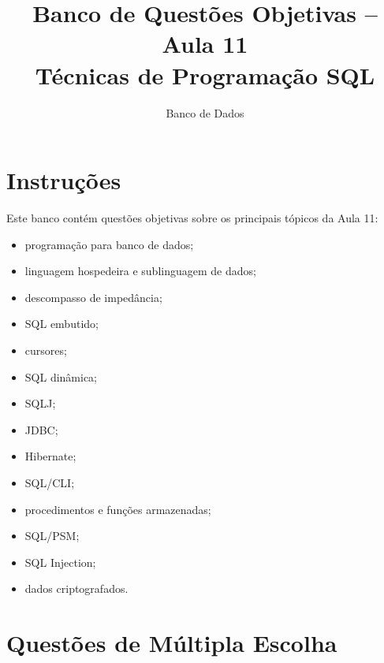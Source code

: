 \documentclass[12pt,a4paper]{article}
\title{Banco de Questões Objetivas -- Aula 11\\Técnicas de Programação SQL}
\author{Banco de Dados}
\date{}
\begin{document}
\maketitle

\section*{Instruções}

Este banco contém questões objetivas sobre os principais tópicos da Aula 11:
\begin{itemize}
    \item programação para banco de dados;
    \item linguagem hospedeira e sublinguagem de dados;
    \item descompasso de impedância;
    \item SQL embutido;
    \item cursores;
    \item SQL dinâmica;
    \item SQLJ;
    \item JDBC;
    \item Hibernate;
    \item SQL/CLI;
    \item procedimentos e funções armazenadas;
    \item SQL/PSM;
    \item SQL Injection;
    \item dados criptografados.
\end{itemize}

\section{Questões de Múltipla Escolha}
\end{document}
